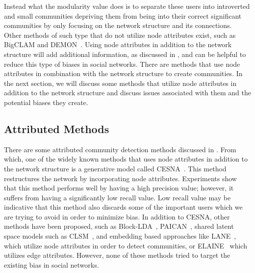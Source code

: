 Instead what the modularity value does is to separate these users into introverted and small communities depriving them from being into their correct significant communities by only focusing on the network structure and its connections. Other methods of such type that do not utilize node attributes exist, such as BigCLAM and DEMON~\cite{yang2013overlapping,coscia2012demon}. Using node attributes in addition to the network structure will add additional information, as discussed in \cite{cho2016latent}, and can be helpful to reduce this type of biases in social networks. There are methods that use node attributes in combination with the network structure to create communities. In the next section, we will discuss some methods that utilize node attributes in addition to the network structure and discuss issues associated with them and the potential biases they create.

\subsection{Attributed Methods}
There are some attributed community detection methods discussed in \cite{Falih:2018:CDA:3184558.3191570}. From which, one of the widely known methods that uses node attributes in addition to the network structure is a generative model called CESNA~\cite{6729613}. This method restructures the network by incorporating node attributes. Experiments show that this method performs well by having a high precision value; however, it suffers from having a significantly low recall value. Low recall value may be indicative that this method also discards some of the important users which we are trying to avoid in order to minimize bias. In addition to CESNA, other methods have been proposed, such as Block-LDA~\cite{balasubramanyan2011block}, PAICAN~\cite{Bojchevski2018BayesianRA}, shared latent space models such as CLSM~\cite{cho2016latent}, and embedding based approaches like  LANE~\cite{huang2017label}, which utilize node attributes in order to detect communities, or ELAINE~\cite{Goyal:2018:ENE:3209542.3209571} which utilizes edge attributes. However, none of these methods tried to target the existing bias in social networks.
